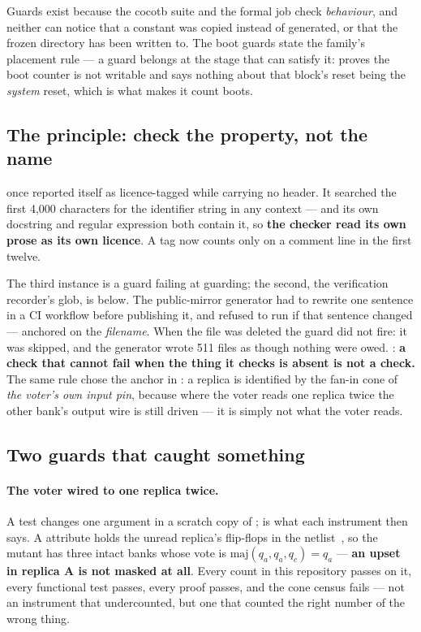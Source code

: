 Guards exist because the cocotb suite and the formal job check \emph{behaviour}, and neither can notice that a constant was copied instead of generated, or that the frozen directory has been written to. The boot guards state the family's placement rule --- a guard belongs at the stage that can satisfy it:  proves the boot counter is not writable and says nothing about that block's reset being the \emph{system} reset, which is what makes it count boots.

\subsection{The principle: check the property, not the name}

 once reported itself as licence-tagged
while carrying no header. It searched the first 4,000 characters for the identifier string in any context --- and its own docstring and regular expression both contain it, so \textbf{the checker read its own prose as its own licence}. A tag now counts only on a comment line in the first twelve.

The third instance is a guard failing at guarding; the second, the
verification recorder's glob, is below. The public-mirror generator had
to rewrite one sentence in a CI workflow before publishing it, and
refused to run if that sentence changed --- anchored on the
\emph{filename}. When the file was deleted the guard did not fire: it was skipped, and the generator wrote 511 files as though nothing were owed. : \textbf{a check that cannot fail when the
thing it checks is absent is not a check.} The same rule chose the
anchor in : a replica is
identified by the fan-in cone of \emph{the voter's own input pin},
because where the voter reads one replica twice the other bank's output
wire is still driven --- it is simply not what the voter reads.

\subsection{Two guards that caught something}

\paragraph{The voter wired to one replica twice.} A test changes one
argument in a scratch copy of ;
 is what each instrument then says. A 
attribute holds the unread replica's flip-flops in the netlist~\cite{esa_ftmr}, so the
mutant has three intact banks whose vote is
$\mathrm{maj}(q_a, q_a, q_c) = q_a$ --- \textbf{an upset in replica A is
not masked at all}. Every count in this repository passes on it, every functional test passes, every proof passes, and the cone census fails --- not an instrument that undercounted, but one that counted the right number of the wrong thing.

